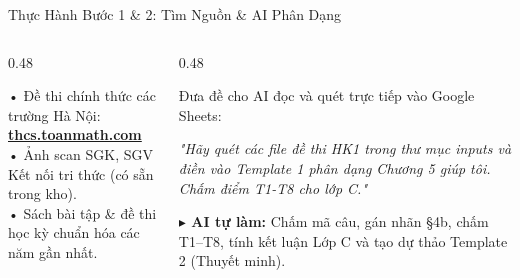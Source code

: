 \documentclass[aspectratio=169,11pt]{beamer}
\begin{document}
\begin{frame}{Thực Hành Bước 1 \& 2: Tìm Nguồn \& AI Phân Dạng}
  \begin{columns}[T]
    \begin{column}{0.48\textwidth}
      \begin{tcolorbox}[slidecard, title=BƯỚC 1: Chuẩn Bị Inputs Nguồn]
        \scriptsize
        • Đề thi chính thức các trường Hà Nội:\\
        \href{https://thcs.toanmath.com}{\textbf{\color{info}thcs.toanmath.com}}\\[4pt]
        • Ảnh scan SGK, SGV Kết nối tri thức (có sẵn trong kho).\\[4pt]
        • Sách bài tập \& đề thi học kỳ chuẩn hóa các năm gần nhất.
      \end{tcolorbox}
    \end{column}

    \begin{column}{0.48\textwidth}
      \begin{tcolorbox}[accentcard, title=BƯỚC 2: AI Quét Đề \& Lập Template 1 \& 2]
        \scriptsize
        Đưa đề cho AI đọc và quét trực tiếp vào Google Sheets:
        \vspace{2pt}
        \begin{tcolorbox}[quotecard]
          \color{brand}\itshape\tiny
          "Hãy quét các file đề thi HK1 trong thư mục inputs và điền vào Template 1 phân dạng Chương 5 giúp tôi. Chấm điểm T1-T8 cho lớp C."
        \end{tcolorbox}
        \vspace{1pt}
        {\color{success}\textbf{$\blacktriangleright$ AI tự làm:}} Chấm mã câu, gán nhãn §4b, chấm T1–T8, tính kết luận Lớp C và tạo dự thảo Template 2 (Thuyết minh).
      \end{tcolorbox}
    \end{column}
  \end{columns}
\end{frame}
\end{document}
